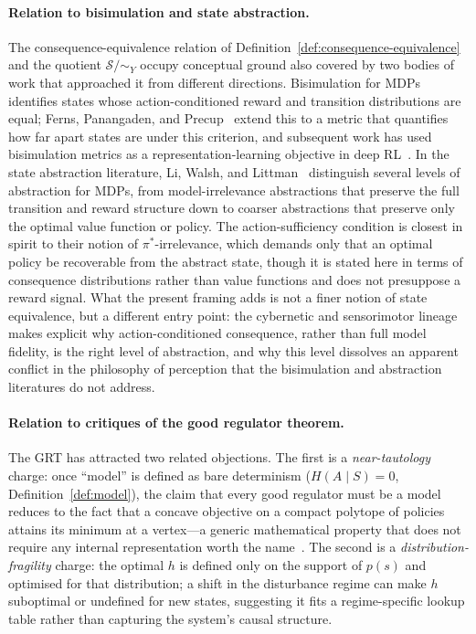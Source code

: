 \documentclass[11pt]{article}
\theoremstyle{remark}
\newcommand{\Scal}{\mathcal S}
\newcommand{\1}{\mathbb 1}
\begin{document}
\paragraph{Relation to bisimulation and state abstraction.}
The consequence-equivalence relation of Definition~\ref{def:consequence-equivalence} and the quotient $\Scal/{\sim_Y}$ occupy conceptual ground also covered by two bodies of work that approached it from different directions. Bisimulation for MDPs identifies states whose action-conditioned reward and transition distributions are equal; Ferns, Panangaden, and Precup~\citep{Ferns-metrics04} extend this to a metric that quantifies how far apart states are under this criterion, and subsequent work has used bisimulation metrics as a representation-learning objective in deep RL~\citep{Zhang-learning21,Castro-mico21}. In the state abstraction literature, Li, Walsh, and Littman~\citep{Li-towards06} distinguish several levels of abstraction for MDPs, from model-irrelevance abstractions that preserve the full transition and reward structure down to coarser abstractions that preserve only the optimal value function or policy. The action-sufficiency condition is closest in spirit to their notion of $\pi^*$-irrelevance, which demands only that an optimal policy be recoverable from the abstract state, though it is stated here in terms of consequence distributions rather than value functions and does not presuppose a reward signal. What the present framing adds is not a finer notion of state equivalence, but a different entry point: the cybernetic and sensorimotor lineage makes explicit why action-conditioned consequence, rather than full model fidelity, is the right level of abstraction, and why this level dissolves an apparent conflict in the philosophy of perception that the bisimulation and abstraction literatures do not address.

\paragraph{Relation to critiques of the good regulator theorem.}
The GRT has attracted two related objections. The first is a \emph{near-tautology} charge: once ``model'' is defined as bare determinism ($H(A\mid S)=0$, Definition~\ref{def:model}), the claim that every good regulator must be a model reduces to the fact that a concave objective on a compact polytope of policies attains its minimum at a vertex---a generic mathematical property that does not require any internal representation worth the name~\citep{Nikolic-XXXX}. The second is a \emph{distribution-fragility} charge: the optimal $h$ is defined only on the support of $p(s)$ and optimised for that distribution; a shift in the disturbance regime can make $h$ suboptimal or undefined for new states, suggesting it fits a regime-specific lookup table rather than capturing the system's causal structure.
\end{document}
